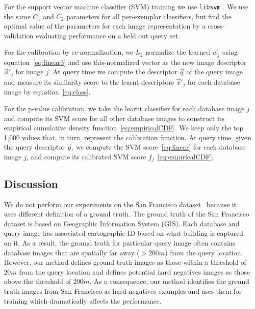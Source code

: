       For the support vector machine classifier (SVM) training we use {\tt libsvm} \cite{libsvm}. We use the same $C_1$ and $C_2$ parameters for all per-exemplar classifiers, but find the optimal value of the parameters for each image representation by a cross-validation evaluating performance on a held out query set.

      For the calibration by re-normalization, we $L_2$ normalize the learned $\vec{w}_j$ using equation~\eqref{eq:linear3} and use this-normalized vector as the new image descriptor $\vec{x}'_j$ for image $j$. At query time we compute the descriptor $\vec{q}$ of the query image and measure its similarity score to the learnt descriptors $\vec{x}'_j$ for each database image by equation~\eqref{eq:class}.

      For the p-value calibration, we take the learnt classifier for each database image $j$ and compute its SVM score for all other database images to construct its empirical cumulative density function~\eqref{eq:empiricalCDF}. We keep only the top 1,000 values that, in turn, represent the calibration function. At query time, given the query descriptor $\vec{q}$, we compute the SVM score~\eqref{eq:linear} for each database image $j$, and compute its calibrated SVM score $f_j$~\eqref{eq:empiricalCDF}.

      \subsection{Discussion}
      \textcolor{petr}{
      We do not perform our experiments on the San Francisco dataset~\cite{Chen11} because it uses different definition of a ground truth. The ground truth of the San Francisco dataset is based on Geographic Information System (GIS). Each database and query image has associated cartographic ID based on what building is captured on it. As a result, the ground truth for particular query image often contains database images that are spatially far away ($> 200m$) from the query location.  However, our method defines ground truth images as those within a threshold of $20m$ from the query location and defines potential hard negatives images as those above the threshold of $200m$. As a consequence, our method identifies the ground truth images from San Francisco as hard negatives examples and uses them for training which dramatically affects the performance.
      }


